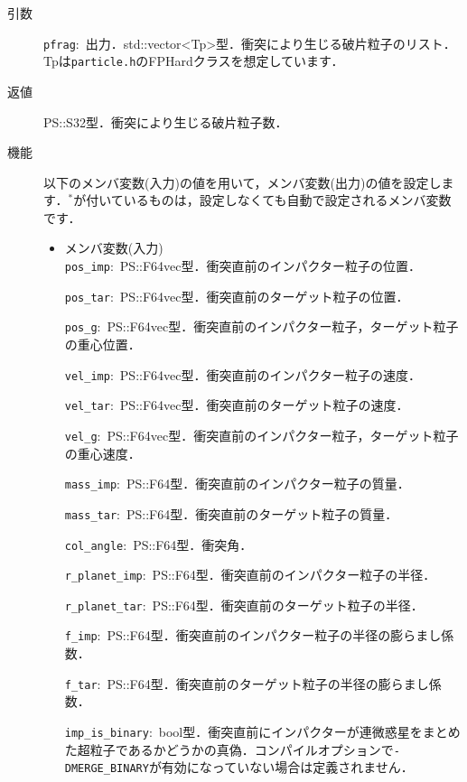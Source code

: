 \documentclass[12pt,a4paper,dvipdfmx]{jsarticle}
\begin{document}
\begin{description}
\item[引数]

\texttt{pfrag}:\ 出力．std::vector<Tp>型．衝突により生じる破片粒子のリスト．Tpは\texttt{particle.h}のFPHardクラスを想定しています．

\item[返値]

PS::S32型．衝突により生じる破片粒子数．

\item[機能]

以下のメンバ変数(入力)の値を用いて，メンバ変数(出力)の値を設定します．${}^{*}$が付いているものは，設定しなくても自動で設定されるメンバ変数です．
\begin{itemize}

\item
メンバ変数(入力)\\
\texttt{pos\_imp}:\ PS::F64vec型．衝突直前のインパクター粒子の位置．

\texttt{pos\_tar}:\ PS::F64vec型．衝突直前のターゲット粒子の位置．

\texttt{pos\_g}:\ PS::F64vec型．衝突直前のインパクター粒子，ターゲット粒子の重心位置．

\texttt{vel\_imp}:\ PS::F64vec型．衝突直前のインパクター粒子の速度．

\texttt{vel\_tar}:\ PS::F64vec型．衝突直前のターゲット粒子の速度．

\texttt{vel\_g}:\ PS::F64vec型．衝突直前のインパクター粒子，ターゲット粒子の重心速度．

\texttt{mass\_imp}:\ PS::F64型．衝突直前のインパクター粒子の質量．

\texttt{mass\_tar}:\ PS::F64型．衝突直前のターゲット粒子の質量．

\texttt{col\_angle}:\ PS::F64型．衝突角．

\texttt{r\_planet\_imp}:\ PS::F64型．衝突直前のインパクター粒子の半径．

\texttt{r\_planet\_tar}:\ PS::F64型．衝突直前のターゲット粒子の半径．

\texttt{f\_imp}:\ PS::F64型．衝突直前のインパクター粒子の半径の膨らまし係数．

\texttt{f\_tar}:\ PS::F64型．衝突直前のターゲット粒子の半径の膨らまし係数．

\texttt{imp\_is\_binary}:\ bool型．衝突直前にインパクターが連微惑星をまとめた超粒子であるかどうかの真偽．コンパイルオプションで\texttt{-DMERGE\_BINARY}が有効になっていない場合は定義されません．


\end{itemize}
\end{description}
\end{document}

